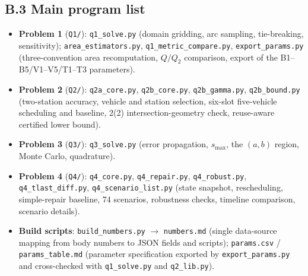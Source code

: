 \subsection*{B.3 Main program list}
\begin{itemize}
\item \textbf{Problem 1} (\texttt{Q1/}): \texttt{q1\_solve.py} (domain gridding, arc sampling, tie-breaking, sensitivity); \texttt{area\_estimators.py}, \texttt{q1\_metric\_compare.py}, \texttt{export\_params.py} (three-convention area recomputation, $Q/Q_2$ comparison, export of the B1--B5/V1--V5/T1--T3 parameters).
\item \textbf{Problem 2} (\texttt{Q2/}): \texttt{q2a\_core.py}, \texttt{q2b\_core.py}, \texttt{q2b\_gamma.py}, \texttt{q2b\_bound.py} (two-station accuracy, vehicle and station selection, six-slot five-vehicle scheduling and baseline, 2(2) intersection-geometry check, reuse-aware certified lower bound).
\item \textbf{Problem 3} (\texttt{Q3/}): \texttt{q3\_solve.py} (error propagation, $s_{\max}$, the $(a,b)$ region, Monte Carlo, quadrature).
\item \textbf{Problem 4} (\texttt{Q4/}): \texttt{q4\_core.py}, \texttt{q4\_repair.py}, \texttt{q4\_robust.py}, \texttt{q4\_tlast\_diff.py}, \texttt{q4\_scenario\_list.py} (state snapshot, rescheduling, simple-repair baseline, 74 scenarios, robustness checks, timeline comparison, scenario details).
\item \textbf{Build scripts}: \texttt{build\_numbers.py} $\to$ \texttt{numbers.md} (single data-source mapping from body numbers to JSON fields and scripts); \texttt{params.csv} / \texttt{params\_table.md} (parameter specification exported by \texttt{export\_params.py} and cross-checked with \texttt{q1\_solve.py} and \texttt{q2\_lib.py}).
\end{itemize}

